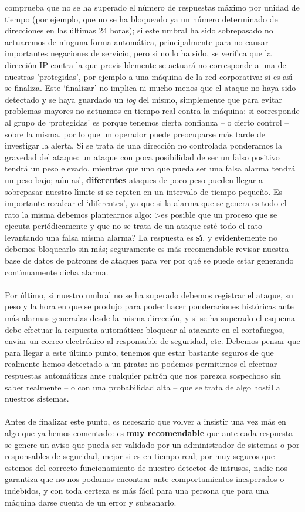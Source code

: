 comprueba que no se ha superado el n\'umero de respuestas m\'aximo por unidad
de tiempo (por ejemplo, que no se ha bloqueado ya un n\'umero determinado de
direcciones en las \'ultimas 24 horas); si este umbral ha sido sobrepasado no
actuaremos de ninguna forma autom\'atica, principalmente para no causar 
importantes negaciones de servicio, pero si no lo ha sido,
se verifica que la direcci\'on IP contra la que previsiblemente se actuar\'a no
corresponde a una de nuestras 'protegidas', por ejemplo a una m\'aquina de la
red corporativa: si es as\'{\i} se finaliza. Este `finalizar' no implica ni
mucho menos que el ataque no haya sido detectado y se haya guardado un {\it log}
del mismo, simplemente que para evitar problemas mayores no actuamos en tiempo
real contra la m\'aquina: si corresponde al grupo de `protegidas' es porque
tenemos cierta confianza -- o cierto control -- sobre la misma, por lo que un
operador puede preocuparse m\'as tarde de investigar la alerta. Si se trata de
una direcci\'on no controlada ponderamos la gravedad del ataque: un ataque con
poca posibilidad de ser un falso po\-si\-ti\-vo tendr\'a un peso elevado, 
mientras que uno que pueda ser una falsa alarma tendr\'a un peso bajo; a\'un 
as\'{\i}, {\bf diferentes} ataques de poco peso pueden llegar a sobrepasar 
nuestro 
l\'{\i}mite si se repiten en un intervalo de tiempo peque\~no. Es importante 
recalcar el `diferentes', ya que si la alarma que se genera es todo el rato la
misma debemos plantearnos algo: >es posible que un proceso que se ejecuta 
peri\'odicamente y que no se trata de un ataque est\'e todo el rato levantando
una falsa misma alarma? La respuesta es {\bf s\'{\i}}, y evidentemente no 
debemos bloquearlo sin m\'as; seguramente es m\'as recomendable revisar nuestra 
base de datos de patrones de ataques para ver por qu\'e se puede estar 
generando cont\'{\i}nuamente dicha alarma.\\
\\Por \'ultimo, si nuestro umbral no se ha superado debemos registrar el ataque,
su peso y la hora en que se produjo para poder hacer ponderaciones hist\'oricas
ante m\'as alarmas generadas desde la misma direcci\'on, y si se ha superado
el esquema debe efectuar la respuesta autom\'atica: bloquear al atacante en
el cortafuegos, enviar un correo electr\'onico al responsable de seguridad, etc.
Debemos pensar que para llegar a este \'ultimo punto, tenemos que estar bastante
seguros de que realmente hemos detectado a un pirata: no podemos permitirnos
el efectuar respuestas autom\'aticas ante cualquier patr\'on que nos parezca
sospechoso sin saber realmente -- o con una probabilidad alta -- que se trata
de algo hostil a nuestros sistemas.\\
\\Antes de finalizar este punto, es necesario que volver a
insistir una vez m\'as en algo que ya hemos comentado: es {\bf muy recomendable}
que ante cada respuesta se genere un aviso que pueda ser validado por un
administrador de sistemas o por responsables de seguridad, mejor si es en
tiempo real; por muy seguros que estemos del correcto funcionamiento de nuestro
detector de intrusos, nadie nos garantiza que no nos podamos encontrar ante 
comportamientos inesperados o indebidos, y con toda certeza es m\'as f\'acil 
para una persona que para una m\'aquina darse cuenta de un error y subsanarlo.
